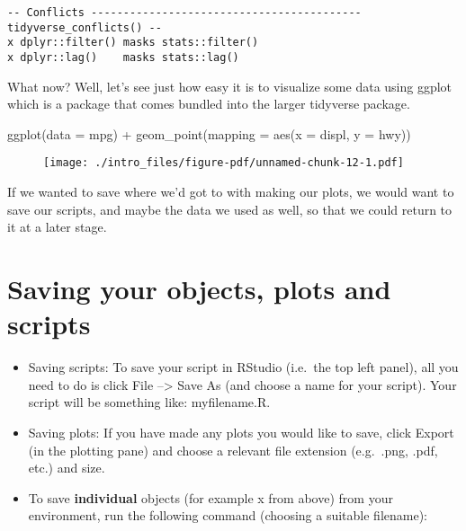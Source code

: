 \documentclass[
  letterpaper,
  DIV=11,
  numbers=noendperiod]{scrreprt}
\newenvironment{Shaded}{\begin{snugshade}}{\end{snugshade}}
\newcommand{\AttributeTok}[1]{\textcolor[rgb]{0.40,0.45,0.13}{#1}}
\newcommand{\FunctionTok}[1]{\textcolor[rgb]{0.28,0.35,0.67}{#1}}
\newcommand{\NormalTok}[1]{\textcolor[rgb]{0.00,0.23,0.31}{#1}}
\newcommand{\SpecialCharTok}[1]{\textcolor[rgb]{0.37,0.37,0.37}{#1}}
\begin{document}
\begin{verbatim}
-- Conflicts ------------------------------------------ tidyverse_conflicts() --
x dplyr::filter() masks stats::filter()
x dplyr::lag()    masks stats::lag()
\end{verbatim}

What now? Well, let's see just how easy it is to visualize some data
using ggplot which is a package that comes bundled into the larger
tidyverse package.

\begin{Shaded}
\begin{Highlighting}[]
\FunctionTok{ggplot}\NormalTok{(}\AttributeTok{data =}\NormalTok{ mpg) }\SpecialCharTok{+} 
  \FunctionTok{geom\_point}\NormalTok{(}\AttributeTok{mapping =} \FunctionTok{aes}\NormalTok{(}\AttributeTok{x =}\NormalTok{ displ, }\AttributeTok{y =}\NormalTok{ hwy))}
\end{Highlighting}
\end{Shaded}

\begin{figure}[H]

{\centering \texttt{[image: ./intro\_files/figure-pdf/unnamed-chunk-12-1.pdf]}

}

\end{figure}

If we wanted to save where we'd got to with making our plots, we would
want to save our scripts, and maybe the data we used as well, so that we
could return to it at a later stage.

\hypertarget{saving-your-objects-plots-and-scripts}{%
\section*{Saving your objects, plots and
scripts}\label{saving-your-objects-plots-and-scripts}}

\begin{itemize}
\item
  Saving scripts: To save your script in RStudio (i.e.~the top left
  panel), all you need to do is click File --\textgreater{} Save As (and
  choose a name for your script). Your script will be something like:
  myfilename.R.
\item
  Saving plots: If you have made any plots you would like to save, click
  Export (in the plotting pane) and choose a relevant file extension
  (e.g.~.png, .pdf, etc.) and size.
\item
  To save \textbf{individual} objects (for example x from above) from
  your environment, run the following command (choosing a suitable
  filename):
\end{itemize}
\end{document}
